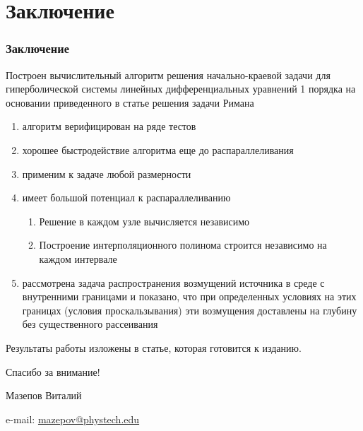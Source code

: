 \documentclass[unicode,aspectratio=43]{beamer}
\newcommand{\colorhref}[2]{\href{#1}{\textcolor{miptbase!30!black}{#2}}}
\begin{document}
\section{Заключение}

\begin{frame}\frametitle{Заключение}
	\small
Построен вычислительный алгоритм решения начально-краевой задачи для гиперболической системы линейных дифференциальных уравнений 1 порядка на основании приведенного в статье решения задачи Римана
\pause
\begin{enumerate} 
	\item {алгоритм верифицирован на ряде тестов}
	\pause
	\item {хорошее быстродействие алгоритма еще до распараллеливания}
	\pause
	\item {применим к задаче любой размерности}
	\pause
	\item {имеет большой потенциал к распараллеливанию}
	\begin{enumerate} 
	\item {Решение в каждом узле вычисляется независимо}
	\item {Построение интерполяционного полинома строится независимо на каждом интервале}
	\end{enumerate} 
	\pause
	\item рассмотрена задача распространения возмущений источника в среде с внутренними границами и показано, что при определенных условиях на этих границах (условия проскальзывания) эти возмущения доставлены на глубину без существенного рассеивания
\end{enumerate} 

Результаты работы изложены в статье, которая готовится к изданию.
\end{frame}


\begin{frame}[plain]
  \begin{center}
  {\Huge Спасибо за внимание!}
  \vspace{8ex}

  Мазепов Виталий

  e-mail: \colorhref{mailto:mazepov@phystech.edu}{mazepov@phystech.edu}
  \end{center}
\end{frame}
\end{document}
